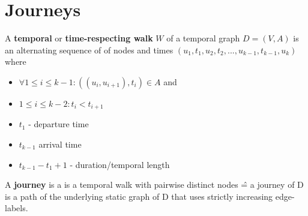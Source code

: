 \documentclass[11pt,a4paper]{article}
\begin{document}
\begin{center}
\end{center}

\section{Journeys}
\begin{tcolorbox}[title=Definition: temporal/time respecting walk]
  A \textbf{temporal} or \textbf{time-respecting walk} $W$ of a temporal graph $D = (V, A)$ is an alternating sequence of of nodes and times $(u_1 , t_1 , u_2 , t_2 , ... , u_{k-1} , t_{k-1} , u_k )$
  where 
  \begin{itemize}
    \item $\forall 1 \leq i \leq k - 1: ((u_i , u_{i+1} ), t_i ) \in A$ and
    \item $1 \leq i \leq k - 2: t_i < t_{i + 1}$ 
  \end{itemize}
\end{tcolorbox}
\begin{itemize}
  \item $t_1$ - departure time
  \item $t_{k - 1}$ arrival time
  \item $t_{k - 1} - t_1 + 1$ - duration/temporal length
\end{itemize}

\begin{tcolorbox}[title=Definition: Journey]
  A \textbf{journey} is a is a temporal walk with pairwise distinct nodes \^{=} a journey of D is a path of the underlying static graph of D that uses
strictly increasing edge-labels.
\end{tcolorbox}
\end{document}
